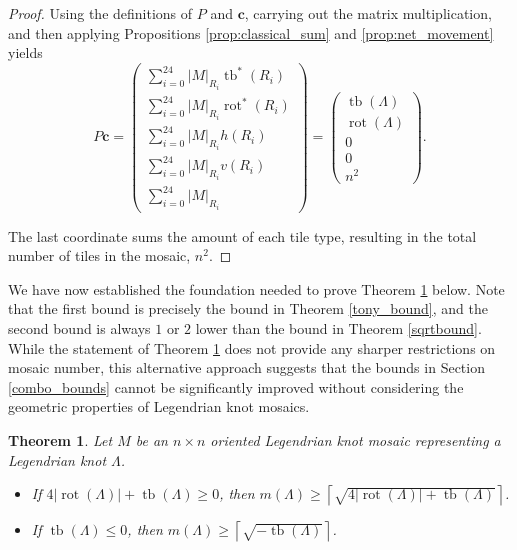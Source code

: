 \documentclass{article}
\DeclareMathOperator{\tb}{tb}
\DeclareMathOperator{\rot}{rot}
\newtheorem{theorem}{Theorem}
\begin{document}
\begin{proof}
    Using the definitions of $P$ and $\textbf{c}$, carrying out the matrix multiplication, and then applying Propositions \ref{prop:classical_sum} and \ref{prop:net_movement} yields
    $$P\textbf{c}=\begin{pmatrix}\sum_{i=0}^{24}|M|_{R_i}\tb^*(R_i)\\\sum_{i=0}^{24}|M|_{R_i}\rot^*(R_i)\\\sum_{i=0}^{24}|M|_{R_i}h(R_i)\\\sum_{i=0}^{24}|M|_{R_i}v(R_i)\\\sum_{i=0}^{24}|M|_{R_i}\end{pmatrix}=\begin{pmatrix}\tb(\Lambda)\\\rot(\Lambda)\\0\\0\\n^2\end{pmatrix}.$$

    The last coordinate sums the amount of each tile type, resulting in the total number of tiles in the mosaic, $n^2$.
\end{proof}

We have now established the foundation needed to prove Theorem \ref{thm:lin-alg} below. Note that the first bound is precisely the bound in Theorem \ref{tony_bound}, and the second bound is always $1$ or $2$ lower than the bound in Theorem \ref{sqrtbound}. While the statement of Theorem \ref{thm:lin-alg} does not provide any sharper restrictions on mosaic number, this alternative approach suggests that the bounds in Section \ref{combo_bounds} cannot be significantly improved without considering the geometric properties of Legendrian knot mosaics.

\begin{theorem} \label{thm:lin-alg}
    Let $M$ be an $n\times n$ oriented Legendrian knot mosaic representing a Legendrian knot $\Lambda$.
    \begin{itemize}
        \item[i.] If $4|\rot(\Lambda)|+\tb(\Lambda)\geq0$, then $m(\Lambda)\geq\left\lceil\sqrt{4|\rot(\Lambda)|+\tb(\Lambda)}\right\rceil$.
        \item[ii.] If $\tb(\Lambda)\leq0$, then $m(\Lambda)\geq\left\lceil\sqrt{-\tb(\Lambda)}\right\rceil$.
    \end{itemize}
\end{theorem}


\end{document}

